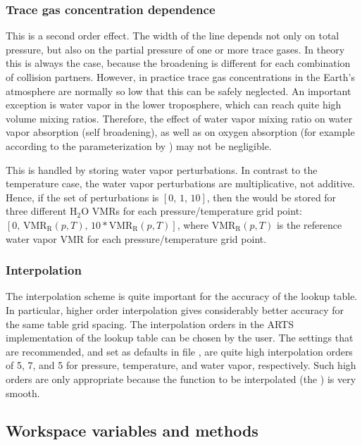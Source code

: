 \subsubsection{Trace gas concentration dependence}

This is a second order effect. The width of the line depends not only
on total pressure, but also on the partial pressure of one or more
trace gases. In theory this is always the case, because the broadening
is different for each combination of collision partners. However, in
practice trace gas concentrations in the Earth's atmosphere are
normally so low that this can be safely neglected. An important
exception is water vapor in the lower troposphere, which can reach
quite high volume mixing ratios. Therefore, the effect of water vapor
mixing ratio on water vapor absorption (self broadening), as well as
on oxygen absorption (for example according to the parameterization by
\citet{pwr:93}) may not be negligible.

This is handled by storing water vapor perturbations.  In contrast to
the temperature case, the water vapor perturbations are
multiplicative, not additive.  Hence, if the set of perturbations is
$[0,\, 1,\, 10]$, then the  would be stored for three
different H$_2$O VMRs for each pressure/temperature grid point: $[0,\,
\mathrm{VMR_R}(p,T),\, 10*\mathrm{VMR_R}(p,T)]$, where
$\mathrm{VMR_R}(p,T)$ is the reference water vapor VMR for each
pressure/temperature grid point.

\subsubsection{Interpolation}

The interpolation scheme is quite important for the accuracy of the
lookup table.  In particular, higher order interpolation gives
considerably better accuracy for the same table grid spacing.  The
interpolation orders in the ARTS implementation of the lookup table
can be chosen by the user.  The settings that are recommended, and set
as defaults in file , are quite high
interpolation orders of 5, 7, and 5 for pressure, temperature, and
water vapor, respectively.  Such high orders are only appropriate
because the function to be interpolated (the ) is very smooth.

\subsection{Workspace variables and methods}

